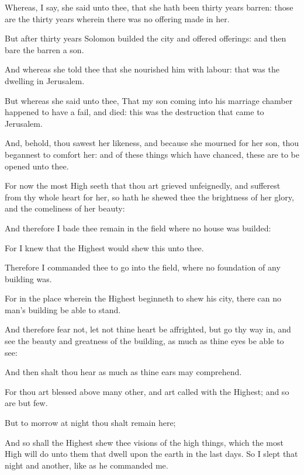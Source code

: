 {\par }{\PP {}Whereas, I say, she said unto thee, that she hath been thirty years barren: those are the thirty years wherein there was no offering made in her.
\par }{\PP {}But after thirty years Solomon builded the city and offered offerings: and then bare the barren a son.
\par }{\PP {}And whereas she told thee that she nourished him with labour: that was the dwelling in Jerusalem.
\par }{\PP {}But whereas she said unto thee, That my son coming into his marriage chamber happened to have a fail, and died: this was the destruction that came to Jerusalem.
\par }{\PP {}And, behold, thou sawest her likeness, and because she mourned for her son, thou begannest to comfort her: and of these things which have chanced, these are to be opened unto thee.
\par }{\PP {}For now the most High seeth that thou art grieved unfeignedly, and sufferest from thy whole heart for her, so hath he shewed thee the brightness of her glory, and the comeliness of her beauty:
\par }{\PP {}And therefore I bade thee remain in the field where no house was builded:
\par }{\PP {}For I knew that the Highest would shew this unto thee.
\par }{\PP {}Therefore I commanded thee to go into the field, where no foundation of any building was.
\par }{\PP {}For in the place wherein the Highest beginneth to shew his city, there can no man’s building be able to stand.
\par }{\PP {}And therefore fear not, let not thine heart be affrighted, but go thy way in, and see the beauty and greatness of the building, as much as thine eyes be able to see:
\par }{\PP {}And then shalt thou hear as much as thine ears may comprehend.
\par }{\PP {}For thou art blessed above many other, and art called with the Highest; and so are but few.
\par }{\PP {}But to morrow at night thou shalt remain here;
\par }{\PP {}And so shall the Highest shew thee visions of the high things, which the most High will do unto them that dwell upon the earth in the last days. So I slept that night and another, like as he commanded me.

}
